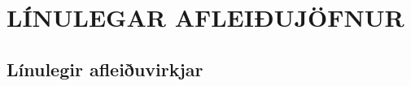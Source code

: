 \newenvironment{se}{\begin{setning+}\sl}{\hfill$\square$\end{setning+}\rm}
\newenvironment{sex}{\begin{setning+}\sl}{\hfill$\blacksquare$\end{setning+}\rm}
\newenvironment{sk}{\begin{skilgreining+}\rm}{\hfill$\square$\end{skilgreining+}\rm}
\newenvironment{sesk}{\begin{setningogskilgreining+}\rm}{\hfill$\square$\end{setningogskilgreining+}\rm}
\newenvironment{hs}{\begin{hjalparsetning+}\sl}{\hfill$\square$\end{hjalparsetning+}\rm}
\newenvironment{fs}{\begin{fylgisetning+}\sl}{\hfill$\square$\end{fylgisetning+}\rm}
\newenvironment{sy}{\begin{synidaemi+}\rm}{\hfill$\square$\end{synidaemi+}\rm}
\newenvironment{fo}{\begin{forrit+}\rm}{\hfill\end{forrit+}\rm}
\newenvironment{so}{\medbreak\noindent{\it Sönnun:}\rm}{\hfill$\blacksquare$\rm}
\newenvironment{sotx}[1]{\medbreak\noindent{\it #1:}\rm}{\hfill$\blacksquare$\rm}
\newcommand{\aefing}{\section{Æfingardæmi} \setcounter{daemateljari}{1}}
\newcommand{\daemi}{
{\medskip\noindent{\bf \thedaemateljari.}}
\addtocounter{daemateljari}{1}
}

\def\svar#1{\smallskip\noindent{\bf #1.} \ }
\def\lausn#1{\smallskip\noindent{\bf #1.} \ }
\def\ugrein#1{\medbreak\noindent{\bf #1.} }
\newcommand{\samantekt}{\noindent{\bf Samantekt.} }

\chapter
{LÍNULEGAR AFLEIÐUJÖFNUR}
 


\section{Línulegir afleiðuvirkjar}


